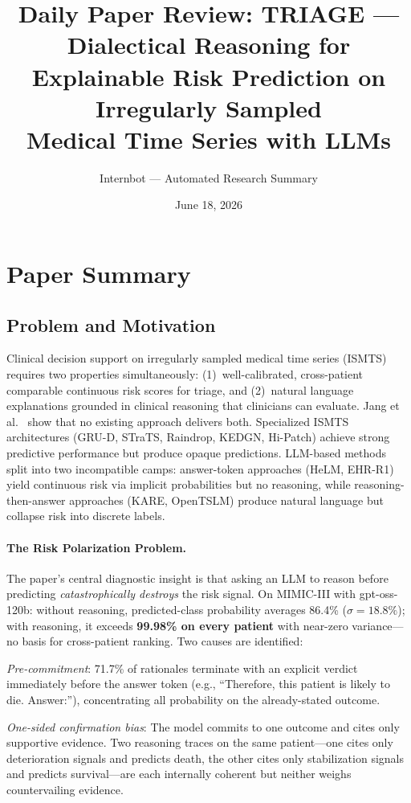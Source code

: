 \documentclass[11pt,a4paper]{article}
\title{Daily Paper Review: TRIAGE --- Dialectical Reasoning for\\Explainable Risk Prediction on Irregularly Sampled\\Medical Time Series with LLMs}
\author{Internbot --- Automated Research Summary}
\date{June 18, 2026}
\begin{document}
\maketitle

\section{Paper Summary}

\subsection{Problem and Motivation}

Clinical decision support on irregularly sampled medical time series (ISMTS) requires two properties simultaneously: (1)~well-calibrated, cross-patient comparable continuous risk scores for triage, and (2)~natural language explanations grounded in clinical reasoning that clinicians can evaluate. Jang et al.~\cite{jang2026triage} show that no existing approach delivers both. Specialized ISMTS architectures (GRU-D, STraTS, Raindrop, KEDGN, Hi-Patch) achieve strong predictive performance but produce opaque predictions. LLM-based methods split into two incompatible camps: answer-token approaches (HeLM, EHR-R1) yield continuous risk via implicit probabilities but no reasoning, while reasoning-then-answer approaches (KARE, OpenTSLM) produce natural language but collapse risk into discrete labels.

\paragraph{The Risk Polarization Problem.} The paper's central diagnostic insight is that asking an LLM to reason before predicting \emph{catastrophically destroys} the risk signal. On MIMIC-III with gpt-oss-120b: without reasoning, predicted-class probability averages 86.4\% ($\sigma=18.8\%$); with reasoning, it exceeds \textbf{99.98\% on every patient} with near-zero variance---no basis for cross-patient ranking. Two causes are identified:

\emph{Pre-commitment}: 71.7\% of rationales terminate with an explicit verdict immediately before the answer token (e.g., ``Therefore, this patient is likely to die. Answer:''), concentrating all probability on the already-stated outcome.

\emph{One-sided confirmation bias}: The model commits to one outcome and cites only supportive evidence. Two reasoning traces on the same patient---one cites only deterioration signals and predicts death, the other cites only stabilization signals and predicts survival---are each internally coherent but neither weighs countervailing evidence.
\end{document}
